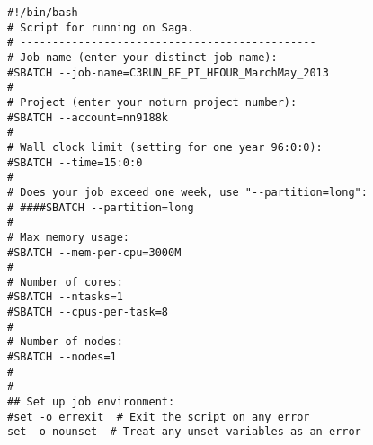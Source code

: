 \begin{lstlisting}
#!/bin/bash
# Script for running on Saga.
# ----------------------------------------------
# Job name (enter your distinct job name):
#SBATCH --job-name=C3RUN_BE_PI_HFOUR_MarchMay_2013
#
# Project (enter your noturn project number):
#SBATCH --account=nn9188k
#
# Wall clock limit (setting for one year 96:0:0):
#SBATCH --time=15:0:0
#
# Does your job exceed one week, use "--partition=long":
# ####SBATCH --partition=long
#
# Max memory usage:
#SBATCH --mem-per-cpu=3000M
#
# Number of cores:
#SBATCH --ntasks=1
#SBATCH --cpus-per-task=8
#
# Number of nodes:
#SBATCH --nodes=1
#
#
## Set up job environment:
#set -o errexit  # Exit the script on any error
set -o nounset  # Treat any unset variables as an error
\end{lstlisting}
